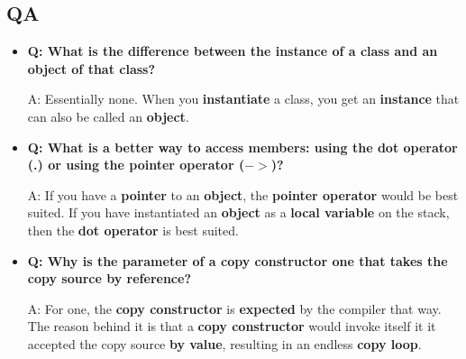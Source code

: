 \documentclass[10pt]{article}
\begin{document}
\newpage
\subsection{QA}
\begin{itemize}
	\item \textbf{Q: What is the difference between the instance of a class and an object of that class?}

		A: Essentially none. When you \textbf{instantiate} a class, you get an \textbf{instance} that can also be called an \textbf{object}.\\

	\item \textbf{Q: What is a better way to access members: using the dot operator (.) or using the pointer operator ($->$)?}

		A: If you have a \textbf{pointer} to an \textbf{object}, the \textbf{pointer operator} would be best suited.
		If you have instantiated an \textbf{object} as a \textbf{local variable} on the stack, then the \textbf{dot operator} is best suited.\\ 

	\item \textbf{Q: Why is the parameter of a copy constructor one that takes the copy source by reference?}
	
		A: For one, the \textbf{copy constructor} is \textbf{expected} by the compiler that way. The reason behind it is that a \textbf{copy constructor} would invoke itself it it accepted the copy source \textbf{by value}, resulting in an endless \textbf{copy loop}.
\end{itemize}

\newpage
\end{document}
